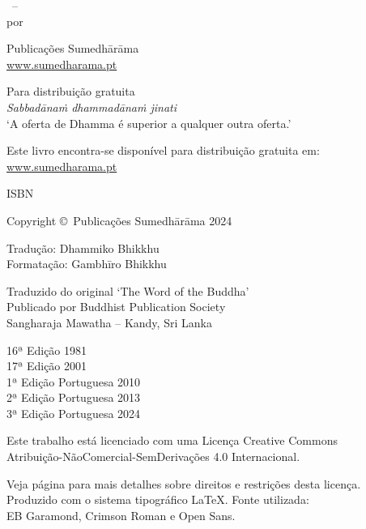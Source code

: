 \cleartoverso
\thispagestyle{empty}

{\copyrightsize
\centering
\setlength{\parindent}{0pt}%
\setlength{\parskip}{0.8\baselineskip}%

\thetitle\ -- \thesubtitle\\
por \theauthor

Publicações Sumedhārāma\\
\href{https://sumedharama.pt}{www.sumedharama.pt}

Para distribuição gratuita\\
\textit{Sabbadānaṁ dhammadānaṁ jinati}\\
‘A oferta de Dhamma é superior a qualquer outra oferta.’

Este livro encontra-se disponível para distribuição gratuita em:\\
\href{https://sumedharama.pt}{www.sumedharama.pt}

ISBN \theISBN

Copyright \copyright\ Publicações Sumedhārāma 2024

Tradução: Dhammiko Bhikkhu\\
Formatação: Gambhīro Bhikkhu

Traduzido do original `The Word of the Buddha'\\
Publicado por Buddhist Publication Society\\
Sangharaja Mawatha -- Kandy, Sri Lanka

16ª Edição 1981\\
17ª Edição 2001\\
1ª Edição Portuguesa 2010\\
2ª Edição Portuguesa 2013\\
3ª Edição Portuguesa 2024

\vfill

{\footnotesize

Este trabalho está licenciado com uma Licença Creative Commons\\
Atribuição-NãoComercial-SemDerivações 4.0 Internacional.

Veja página \pageref{copyright-details} para mais detalhes sobre direitos e restrições desta licença.\\
Produzido com o sistema tipográfico \LaTeX. Fonte utilizada:\\
EB Garamond, Crimson Roman e Open Sans.

\theEditionInfo

}}
